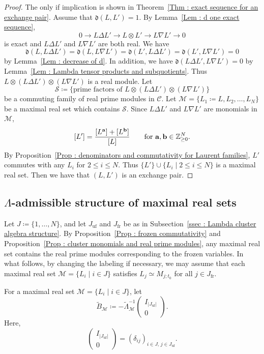 \begin{proof}
The only if implication is shown in
Theorem~\ref{Thm : exact sequence for an exchange pair}.
Assume that $\mathfrak{d}(L, L') = 1$.
By Lemma~\ref{Lem : d one exact sequence},
\[
0 \longrightarrow L \Delta L'
\longrightarrow L \otimes L'
\longrightarrow L \nabla L'
\longrightarrow 0
\]
is exact and $L \Delta L'$ and $L \nabla L'$ are both real.
We have
\[
\mathfrak{d}(L, L \Delta L')
= \mathfrak{d}(L, L \nabla L')
= \mathfrak{d}(L', L \Delta L')
= \mathfrak{d}(L', L \nabla L') = 0
\]
by Lemma~\ref{Lem : decrease of d}.
In addition, we have
$\mathfrak{d}(L \Delta L', L \nabla L') = 0$
by Lemma~\ref{Lem : Lambda tensor products and subquotients}.
Thus $L \otimes (L \Delta L') \otimes (L \nabla L')$ is a real module. 
Let 
\[
\mathcal{S} \coloneq
\{\text{prime factors of }
L \otimes (L \Delta L') \otimes (L \nabla L')\}
\]
be a commuting family of real prime modules in $\mathscr{C}$.
Let $\mathcal{M} = \{L_1 \coloneq L, L_2, \ldots, L_N\}$
be a maximal real set which contains $\mathcal{S}$.
Since $L \Delta L'$ and $L \nabla L'$ are monomials in $\mathcal{M}$,
\[
[L'] = \frac{[L^{\mathbf{a}}] + [L^{\mathbf{b}}]}{[L]}
\qquad \text{for $\mathbf{a}, \mathbf{b} \in \mathbb{Z}_{\geq 0}^N$}.
\]
By Proposition~\ref{Prop : denominators and commutativity for Laurent families},
$L'$ commutes with any $L_i$ for $2 \leq i \leq N$.
Thus $\{L'\} \cup \{L_i \mid 2 \leq i \leq N\}$
is a maximal real set.
Then we have that $(L, L')$ is an exchange pair.
\end{proof}

\subsection{$\Lambda$-admissible structure of maximal real sets}
\label{ssec : Lambda admissible structures of maximal real sets}

Let $J \coloneq \{1, \ldots, N\}$, and let
$J_{\mathrm{uf}}$ and $J_{\mathrm{fr}}$ be as in
Subsection~\ref{ssec : Lambda cluster algebra structure}.
By Proposition~\ref{Prop : frozen commutativity} and
Proposition~\ref{Prop : cluster monomials and real prime modules},
any maximal real set contains the real prime modules corresponding to
the frozen variables.
In what follows, by changing the labeling if necessary, we may assume
that each maximal real set $\mathcal M = \{L_i \mid i \in J\}$ satisfies
$L_j \simeq M_{j;t_0}$ for all $j \in J_{\mathrm{fr}}$.

For a maximal real set $\mathcal M = \{L_i \mid i \in J\}$, let
\[
\widetilde B_{\mathcal M}
\coloneq -\widetilde\Lambda_{\mathcal M}^{-1}
\begin{pmatrix} I_{|J_{\mathrm{uf}}|} \\ 0 \end{pmatrix}.
\]
Here,
\[
\begin{pmatrix} I_{|J_{\mathrm{uf}}|} \\ 0 \end{pmatrix}
= (\delta_{ij})_{i \in J,\,j \in J_{\mathrm{uf}}}.
\]

